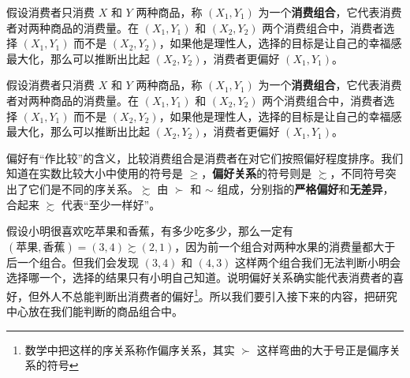 \documentclass[../Main.tex]{subfiles}
\begin{document}
假设消费者只消费 $X$ 和 $Y$ 两种商品，称 $\left(X_1,Y_1\right)$ 为一个\textbf{消费组合}，它代表消费者对两种商品的消费量。在 $\left(X_1,Y_1\right)$ 和 $\left(X_2,Y_2\right)$ 两个消费组合中，消费者选择 $\left(X_1,Y_1\right)$ 而不是 $\left(X_2,Y_2\right)$，如果他是理性人，选择的目标是让自己的幸福感最大化，那么可以推断出比起 $\left(X_2,Y_2\right)$，消费者更偏好 $\left(X_1,Y_1\right)$。

假设消费者只消费 $X$ 和 $Y$ 两种商品，称 $\left(X_1,Y_1\right)$ 为一个\textbf{消费组合}，它代表消费者对两种商品的消费量。在 $\left(X_1,Y_1\right)$ 和 $\left(X_2,Y_2\right)$ 两个消费组合中，消费者选择 $\left(X_1,Y_1\right)$ 而不是 $\left(X_2,Y_2\right)$，如果他是理性人，选择的目标是让自己的幸福感最大化，那么可以推断出比起 $\left(X_2,Y_2\right)$，消费者更偏好 $\left(X_1,Y_1\right)$。

偏好有“作比较”的含义，比较消费组合是消费者在对它们按照偏好程度排序。我们知道在实数比较大小中使用的符号是 $\ge$，\textbf{偏好关系}的符号则是 $\succsim$，不同符号突出了它们是不同的序关系。$\succsim$ 由 $\succ$ 和 $\sim$ 组成，分别指的\textbf{严格偏好}和\textbf{无差异}，合起来 $\succsim$ 代表“至少一样好”。

假设小明很喜欢吃苹果和香蕉，有多少吃多少，那么一定有 $(\text{苹果},\text{香蕉})=\left(3,4\right)\succsim\left(2,1\right)$，因为前一个组合对两种水果的消费量都大于后一个组合。但我们会发现 $\left(3,4\right)$ 和 $\left(4,3\right)$ 这样两个组合我们无法判断小明会选择哪一个，选择的结果只有小明自己知道。说明偏好关系确实能代表消费者的喜好，但外人不总能判断出消费者的偏好\footnote{数学中把这样的序关系称作偏序关系，其实 $\succ$ 这样弯曲的大于号正是偏序关系的符号}。所以我们要引入接下来的内容，把研究中心放在我们能判断的商品组合中。
\end{document}
